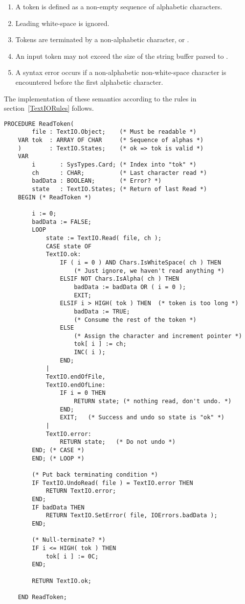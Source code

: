 \begin{enumerate}
\item
    A token is defined as a non-empty sequence of alphabetic characters.
\item
    Leading white-space is ignored.
\item
    Tokens are terminated by a non-alphabetic character,
     or .
\item
    An input token may not exceed the size of the string buffer
    parsed to .
\item
    A syntax error occurs if
    a non-alphabetic non-white-space character is encountered
    before the first alphabetic character.
\end{enumerate}

The implementation of these semantics according to the
rules in section~\ref{TextIORules} follows.
\begin{verbatim}
PROCEDURE ReadToken(
        file : TextIO.Object;    (* Must be readable *)
    VAR tok  : ARRAY OF CHAR     (* Sequence of alphas *)
    )        : TextIO.States;    (* ok => tok is valid *)
    VAR
        i       : SysTypes.Card; (* Index into "tok" *)
        ch      : CHAR;          (* Last character read *)
        badData : BOOLEAN;       (* Error? *)
        state   : TextIO.States; (* Return of last Read *)
    BEGIN (* ReadToken *)

        i := 0;
        badData := FALSE;
        LOOP
            state := TextIO.Read( file, ch );
            CASE state OF
            TextIO.ok:
                IF ( i = 0 ) AND Chars.IsWhiteSpace( ch ) THEN
                    (* Just ignore, we haven't read anything *)
                ELSIF NOT Chars.IsAlpha( ch ) THEN
                    badData := badData OR ( i = 0 );
                    EXIT;
                ELSIF i > HIGH( tok ) THEN  (* token is too long *)
                    badData := TRUE;
                    (* Consume the rest of the token *)
                ELSE
                    (* Assign the character and increment pointer *)
                    tok[ i ] := ch;
                    INC( i );
                END;
            |
            TextIO.endOfFile,
            TextIO.endOfLine:
                IF i = 0 THEN
                    RETURN state; (* nothing read, don't undo. *)
                END;
                EXIT;   (* Success and undo so state is "ok" *)
            |
            TextIO.error:
                RETURN state;   (* Do not undo *)
	    END; (* CASE *)
        END; (* LOOP *)

        (* Put back terminating condition *)
        IF TextIO.UndoRead( file ) = TextIO.error THEN
            RETURN TextIO.error;
        END;
        IF badData THEN
            RETURN TextIO.SetError( file, IOErrors.badData );
        END;

        (* Null-terminate? *)
        IF i <= HIGH( tok ) THEN
            tok[ i ] := 0C;
        END;

        RETURN TextIO.ok;

    END ReadToken;
\end{verbatim}


